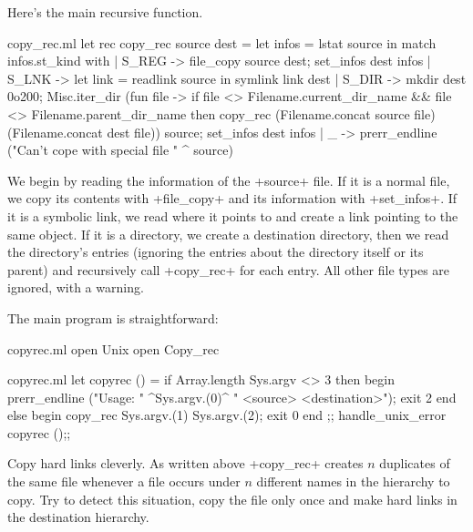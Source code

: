 Here's the main recursive function. 
\begin{listingcodefile}{copy_rec.ml}
let rec copy_rec source dest =
  let infos = lstat source in
  match infos.st_kind with
  | S_REG ->
      file_copy source dest;
      set_infos dest infos
  | S_LNK ->
      let link = readlink source in
      symlink link dest
  | S_DIR ->
      mkdir dest 0o200;
      Misc.iter_dir
        (fun file ->
          if file <> Filename.current_dir_name 
              && file <> Filename.parent_dir_name 
          then 
            copy_rec
              (Filename.concat source file)
              (Filename.concat dest file))
        source;
      set_infos dest infos
  | _ ->
      prerr_endline ("Can't cope with special file " ^ source)
\end{listingcodefile}
%
We begin by reading the information of the \ml+source+ file. If it is
a normal file, we copy its contents with \ml+file_copy+ and its
information with \ml+set_infos+. If it is a symbolic link, we read
where it points to and create a link pointing to the same object.  If
it is a directory, we create a destination directory, then we read the
directory's entries (ignoring the entries about the directory itself
or its parent) and recursively call \ml+copy_rec+ for each entry. All
other file types are ignored, with a warning.

The main program is straightforward:
%
\begin{codefile}{copyrec.ml}
open Unix
open Copy_rec
\end{codefile}
%
\begin{listingcodefile}{copyrec.ml}
let copyrec () =
  if Array.length Sys.argv <> 3 then begin
    prerr_endline ("Usage: " ^Sys.argv.(0)^ " <source> <destination>");
    exit 2
  end else begin
    copy_rec Sys.argv.(1) Sys.argv.(2);
    exit 0
  end
;;
handle_unix_error copyrec ();;
\end{listingcodefile}

\begin{exercise} 
\label{ex/copyrec}
Copy hard links cleverly. As written above \ml+copy_rec+ creates $n$
duplicates of the same file whenever a file occurs under $n$ different
names in the hierarchy to copy. Try to detect this situation, copy
the file only once and make hard links in the destination hierarchy.
\end{exercise}


